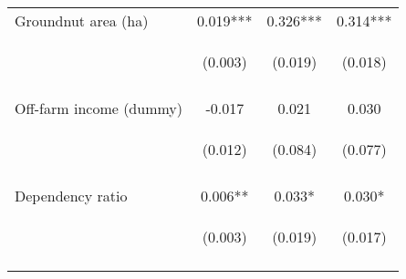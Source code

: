 \begin{center}
\begin{tabular}{lccc}
Groundnut area (ha) & 0.019*** & 0.326*** & 0.314*** \\
 & \begin{footnotesize}(0.003)\end{footnotesize} & \begin{footnotesize}(0.019)\end{footnotesize} & \begin{footnotesize}(0.018)\end{footnotesize} \\
\vspace{4pt} & \begin{footnotesize}[0.000]\end{footnotesize} & \begin{footnotesize}[0.000]\end{footnotesize} & \begin{footnotesize}[0.000]\end{footnotesize} \\
Off-farm income (dummy) & -0.017 & 0.021 & 0.030 \\
 & \begin{footnotesize}(0.012)\end{footnotesize} & \begin{footnotesize}(0.084)\end{footnotesize} & \begin{footnotesize}(0.077)\end{footnotesize} \\
\vspace{4pt} & \begin{footnotesize}[0.159]\end{footnotesize} & \begin{footnotesize}[0.806]\end{footnotesize} & \begin{footnotesize}[0.698]\end{footnotesize} \\
Dependency ratio & 0.006** & 0.033* & 0.030* \\
 & \begin{footnotesize}(0.003)\end{footnotesize} & \begin{footnotesize}(0.019)\end{footnotesize} & \begin{footnotesize}(0.017)\end{footnotesize} \\
\vspace{4pt} & \begin{footnotesize}[0.038]\end{footnotesize} & \begin{footnotesize}[0.080]\end{footnotesize} & \begin{footnotesize}[0.084]\end{footnotesize} \\

\end{tabular}
\end{center}

